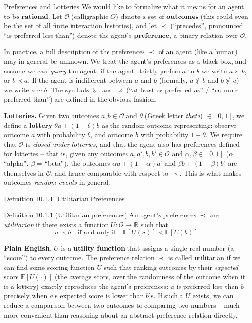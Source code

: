 \documentclass[aspectratio=169,10pt]{beamer}
\newcommand{\R}{\mathbb{R}}
\newcommand{\E}{\mathbb{E}}
\newcommand{\Oc}{\mathcal{O}}
\begin{document}
\begin{frame}{Preferences and Lotteries}
  We would like to formalize what it means for an agent to be
  \textbf{rational}. Let $\Oc$ (calligraphic $O$) denote a set of
  \textbf{outcomes} (this could even be the set of all finite interaction
  histories), and let $\prec$ (``precedes'', pronounced ``is preferred
  less than'') denote the agent's \textbf{preference}, a binary relation
  over $\Oc$.

  \vspace{0.4em}
  In practice, a full description of the preferences $\prec$ of an agent
  (like a human) may in general be unknown. We treat the agent's
  preferences as a black box, and assume we can \emph{query} the agent: if
  the agent strictly prefers $a$ to $b$ we write $a\succ b$, or $b\prec a$.
  If the agent is indifferent between $a$ and $b$ (formally, $a\not\succ b$
  and $b\not\succ a$) we write $a\sim b$. The symbols $\succeq$ and
  $\preceq$ (``at least as preferred as'' / ``no more preferred than'')
  are defined in the obvious fashion.

  \vspace{0.4em}
  \textbf{Lotteries.} Given two outcomes $a,b\in\Oc$ and $\theta$ (Greek
  letter \emph{theta}) $\in[0,1]$, we define a \textbf{lottery}
  $\theta a+(1-\theta)b$ as the random outcome representing: observe
  outcome $a$ with probability $\theta$, and outcome $b$ with probability
  $1-\theta$. We require that $\Oc$ is \emph{closed under lotteries}, and
  that the agent also has preferences defined for lotteries -- that is,
  given any outcomes $a,a',b,b'\in\Oc$ and $\alpha,\beta\in[0,1]$
  ($\alpha$ = ``alpha'', $\beta$ = ``beta''), the outcomes
  $\alpha a+(1-\alpha)a'$ and $\beta b+(1-\beta)b'$ are themselves in
  $\Oc$, and hence comparable with respect to $\prec$. This is what makes
  outcomes \emph{random events} in general.
\end{frame}

\begin{frame}{Definition 10.1.1: Utilitarian Preferences}
  \begin{block}{Definition 10.1.1 (Utilitarian preferences)}
    An agent's preferences $\prec$ are \emph{utilitarian} if there exists a
    function $U:\Oc\to\R$ such that
    \[
      a\prec b \quad\text{if and only if}\quad \E[U(a)] < \E[U(b)]
    \]
  \end{block}
  \textbf{Plain English.} $U$ is a \textbf{utility function} that assigns a
  single real number (a ``score'') to every outcome. The preference
  relation $\prec$ is called utilitarian if we can find some scoring
  function $U$ such that ranking outcomes by their \emph{expected} score
  $\E[U(\cdot)]$ (the average score, over the randomness of the outcome
  when it is a lottery) exactly reproduces the agent's preferences: $a$ is
  preferred less than $b$ precisely when $a$'s expected score is lower
  than $b$'s. If such a $U$ exists, we can reduce a comparison between two
  outcomes to comparing two numbers -- much more convenient than reasoning
  about an abstract preference relation directly.
\end{frame}
\end{document}
